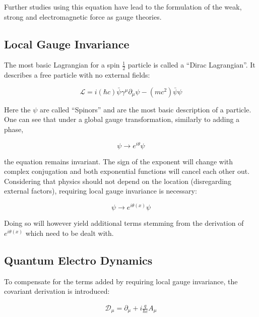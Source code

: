 Further studies using this equation have lead to the formulation of the weak, strong and electromagnetic force as gauge theories. 

\subsection{Local Gauge Invariance}

The most basic Lagrangian for a spin $\frac{1}{2}$ particle is called a ``Dirac Lagrangian''. It describes a free particle with no external fields:

\begin{equation}
  \label{eq:diraclagrangian}
  \mathcal{L} = i (\hbar c) \bar{\psi} \gamma^\mu \partial_\mu \psi - (m c^2) \bar{\psi} \psi
\end{equation}

\noindent Here the $\psi$ are called ``Spinors'' and are the most basic description of a particle. One can see that under a global gauge transformation, similarly to adding a phase,

\begin{equation}
  \label{eq:globalgaugeinv}
  \psi \rightarrow e^{i \theta} \psi
\end{equation}

\noindent the equation remains invariant. The sign of the exponent will change with complex conjugation and both exponential functions will cancel each other out. Considering that physics should not depend on the location (disregarding external factors), requiring local gauge invariance is necessary:

\begin{equation}
  \label{eq:localgaugeinv}
  \psi \rightarrow e^{i \theta(x)} \psi
\end{equation}

\noindent Doing so will however yield additional terms stemming from the derivation of $e^{i \theta(x)}$ which need to be dealt with. 

\subsection{Quantum Electro Dynamics}
\label{sec:qed}

To compensate for the terms added by requiring local gauge invariance, the covariant derivation is introduced:

\begin{align}
  \label{eq:covariantderivative}
  \mathcal{D}_\mu = \partial_\mu + i \frac{q}{\hbar c} A_\mu
\end{align}

